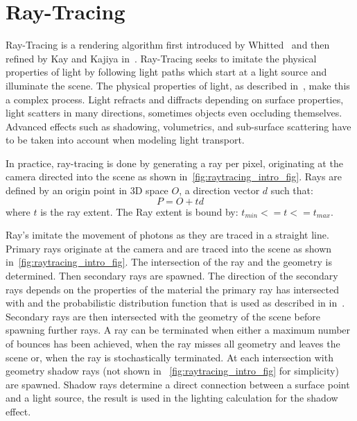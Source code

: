 \section{Ray-Tracing}
\label{sec:rt_intro}

Ray-Tracing is a rendering algorithm first introduced by Whitted~\cite{10.1145/358876.358882} and then refined by Kay and Kajiya in~\cite{10.1145/15886.15916}. Ray-Tracing seeks to imitate the physical properties of light by following light paths which start at a light source and illuminate the scene. The physical properties of light, as described in~\cite{Pharr:2010:PBR:1854996}, make this a complex process. Light refracts and diffracts depending on surface properties, light scatters in many directions, sometimes objects even occluding themselves. Advanced effects such as shadowing, volumetrics, and sub-surface scattering have to be taken into account when modeling light transport.

In practice, ray-tracing is done by generating a ray per pixel, originating at the camera directed into the scene as shown in~\autoref{fig:raytracing_intro_fig}. 
Rays are defined by an origin point in 3D space $O$, a direction vector $d$ such that:
\begin{equation}
\label{eq:ray_equation}
  P = O + td
\end{equation}
where $t$ is the ray extent. The Ray extent is bound by: $t_{min} <= t <= t_{max}$.

Ray's imitate the movement of photons as they are traced in a straight line. Primary rays originate at the camera and are traced into the scene as shown in~\autoref{fig:raytracing_intro_fig}. The intersection of the ray and the geometry is determined. Then secondary rays are spawned. The direction of the secondary rays depends on the properties of the material the primary ray has intersected with and the probabilistic distribution function that is used as described in in~\cite{Pharr:2010:PBR:1854996}. Secondary rays are then intersected with the geometry of the scene before spawning further rays. A ray can be terminated when either a maximum number of bounces has been achieved, when the ray misses all geometry and leaves the scene or, when the ray is stochastically terminated.
At each intersection with geometry shadow rays (not shown in ~\autoref{fig:raytracing_intro_fig} for simplicity) are spawned. Shadow rays determine a direct connection between a surface point and a light source, the result is used in the lighting calculation for the shadow effect.

